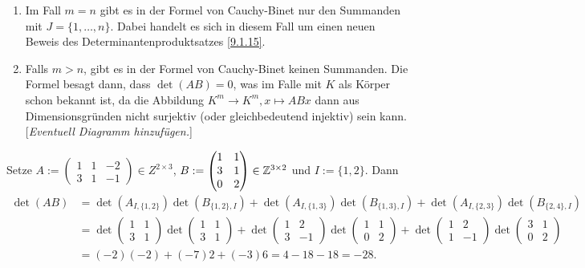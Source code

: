 \documentclass[../../main.tex]{subfiles}
\begin{document}
\begin{bem}\label{17.2.6}
    \begin{enumerate}[\normalfont(a)]
        \item Im Fall $m=n$ gibt es in der Formel von Cauchy-Binet nur den Summanden mit $J=\{1,\ldots,n\}$. Dabei handelt es sich in diesem Fall um einen neuen Beweis des Determinantenproduktsatzes \ref{9.1.15}.
        \item Falls $m>n$, gibt es in der Formel von Cauchy-Binet keinen Summanden. Die Formel besagt dann, dass $\det(AB)=0$, was im Falle mit $K$ als Körper schon bekannt ist, da die Abbildung $K^m\to K^m, x\mapsto ABx$ dann aus Dimensionsgründen nicht surjektiv (oder gleichbedeutend injektiv) sein kann. [\textit{Eventuell Diagramm hinzufügen.}]
    \end{enumerate}
\end{bem}

\begin{bsp}\label{17.2.7}
    Setze $A:=\begin{pmatrix*}1&1&-2\\3&1&-1\end{pmatrix*}\in Z^{2\times 3}$, $B:=\begin{pmatrix*}1&1\\ 3&1\\ 0&2\end{pmatrix*}\in \Z^{3\times 2}$ und $I:=\{1,2\}$. Dann
    \begin{align*}
        \det(AB)&=\det(A_{I,\{1,2\}})\det(B_{\{1,2\},I})+\det(A_{I,\{1,3\}})\det(B_{\{1,3\},I})
        +\det(A_{I,\{2,3\}})\det(B_{\{2,4\},I})\\
        &=\det\begin{pmatrix*}1&1\\3&1\end{pmatrix*}\det\begin{pmatrix*}1&1\\3&1\end{pmatrix*}+\det\begin{pmatrix*}1&2\\3&-1\end{pmatrix*}\det\begin{pmatrix*}1&1\\0&2\end{pmatrix*}
        +\det\begin{pmatrix*}1&2\\1&-1\end{pmatrix*}\det\begin{pmatrix*}3&1\\0&2\end{pmatrix*}\\
        &=(-2)(-2)+(-7)2+(-3)6=4-18-18=-28.
    \end{align*}
\end{bsp}
\end{document}
